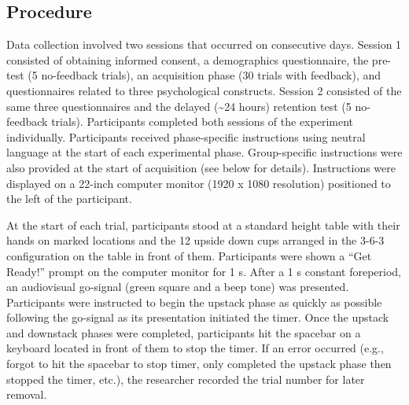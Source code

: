\documentclass[
  doc, donotrepeattitle,floatsintext]{apa7}
\begin{document}
\hypertarget{procedure}{%
\subsection{Procedure}\label{procedure}}

Data collection involved two sessions that occurred on consecutive days. Session 1 consisted of obtaining informed consent, a demographics questionnaire, the pre-test (5 no-feedback trials), an acquisition phase (30 trials with feedback), and questionnaires related to three psychological constructs. Session 2 consisted of the same three questionnaires and the delayed (\textasciitilde24 hours) retention test (5 no-feedback trials). Participants completed both sessions of the experiment individually. Participants received phase-specific instructions using neutral language at the start of each experimental phase. Group-specific instructions were also provided at the start of acquisition (see below for details). Instructions were displayed on a 22-inch computer monitor (1920 x 1080 resolution) positioned to the left of the participant.

At the start of each trial, participants stood at a standard height table with their hands on marked locations and the 12 upside down cups arranged in the 3-6-3 configuration on the table in front of them. Participants were shown a ``Get Ready!'' prompt on the computer monitor for 1 s. After a 1 s constant foreperiod, an audiovisual go-signal (green square and a beep tone) was presented. Participants were instructed to begin the upstack phase as quickly as possible following the go-signal as its presentation initiated the timer. Once the upstack and downstack phases were completed, participants hit the spacebar on a keyboard located in front of them to stop the timer. If an error occurred (e.g., forgot to hit the spacebar to stop timer, only completed the upstack phase then stopped the timer, etc.), the researcher recorded the trial number for later removal.

\begin{table}

\caption{\label{tab:table1}Cronbach's alpha for each questionnaire at each timepoint.}
\end{table}
\end{document}
